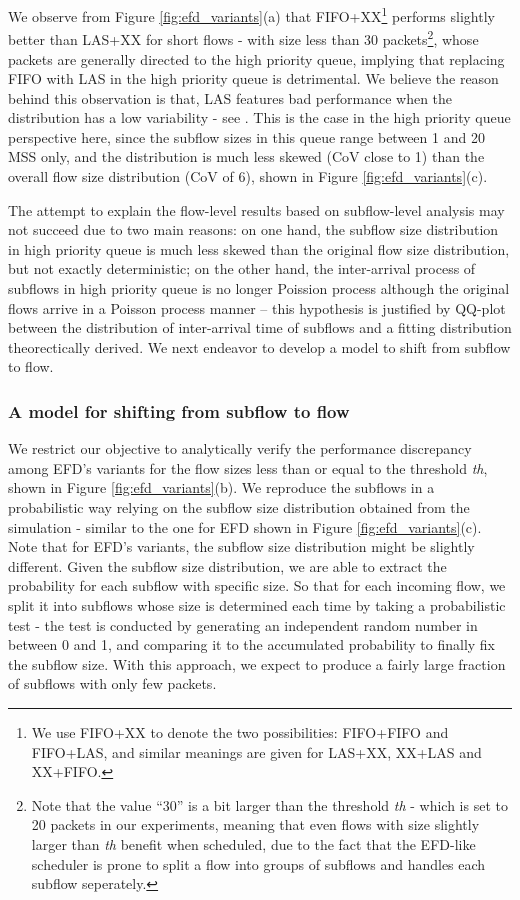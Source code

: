 \documentclass[preprint,12pt]{elsarticle}
\begin{document}
We observe from Figure \ref{fig:efd_variants}(a) that FIFO+XX\footnote{We use FIFO+XX to denote the two possibilities: FIFO+FIFO and FIFO+LAS, and similar meanings are given for LAS+XX, XX+LAS and XX+FIFO.} performs slightly better than LAS+XX for short flows - with size less than 30 packets\footnote{Note that the value ``30'' is a bit larger than the threshold \textit{th} - which is set to 20 packets in our experiments, meaning that even flows with size slightly larger than \textit{th} benefit when scheduled, due to the fact that the EFD-like scheduler is prone to split a flow into groups of subflows and handles each subflow seperately.}, whose packets are generally directed to the high priority queue, implying that replacing FIFO with LAS in the high priority queue is detrimental. We believe the reason behind this observation is that, LAS features bad performance when the distribution has a low variability - see \cite{kleinrock_76_queueing}. This is the case in the high priority queue perspective here, since the subflow sizes in this queue range between 1 and 20 MSS only, and the distribution is much less skewed (CoV close to 1) than the overall flow size distribution (CoV of 6), shown in Figure \ref{fig:efd_variants}(c). 

The attempt to explain the flow-level results based on subflow-level analysis may not succeed due to two main reasons: on one hand, the subflow size distribution in high priority queue is much less skewed than the original flow size distribution, but not exactly deterministic; on the other hand, the inter-arrival process of subflows in high priority queue is no longer Poission process although the original flows arrive in a Poisson process manner -- this hypothesis is justified by QQ-plot between the distribution of inter-arrival time of subflows and a fitting distribution theorectically derived. We next endeavor to develop a model to shift from subflow to flow. 

\subsubsection{A model for shifting from subflow to flow}
We restrict our objective to analytically verify the performance discrepancy among EFD's variants for the flow sizes less than or equal to the threshold \textit{th}, shown in Figure \ref{fig:efd_variants}(b). We reproduce the subflows in a probabilistic way relying on the subflow size distribution obtained from the simulation - similar to the one for EFD shown in Figure \ref{fig:efd_variants}(c). Note that for EFD's variants, the subflow size distribution might be slightly different. Given the subflow size distribution, we are able to extract the probability for each subflow with specific size. So that for each incoming flow, we split it into subflows whose size is determined each time by taking a probabilistic test - the test is conducted by generating an independent random number in between 0 and 1, and comparing it to the accumulated probability to finally fix the subflow size. With this approach, we expect to produce a fairly large fraction of subflows with only few packets.
\end{document}
